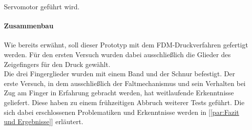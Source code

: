 \documentclass[titlepage,12pt,twoside]{article}
\begin{document}
Servomotor geführt wird. \\
\\
\textbf{Zusammenbau} \\
\\
Wie bereits erwähnt, soll dieser Prototyp mit dem FDM-Druckverfahren gefertigt 
werden. Für den ersten Versuch wurden dabei ausschließlich die Glieder des 
Zeigefingers für den Druck gewählt. \\
Die drei Fingerglieder wurden mit einem Band und der Schnur befestigt. 
Der erste Versuch, in dem ausschließlich der Faltmechanismus und sein 
Verhalten bei Zug am Finger in Erfahrung gebracht werden, hat weitlaufende 
Erkenntnisse geliefert. Diese haben zu einem frühzeitigen Abbruch weiterer 
Tests geführt. Die sich dabei erschlossenen Problematiken und Erkenntnisse 
werden in [\textcolor{blue}{\autoref{par:Fazit und Ergebnisse}}] erläutert. \\
\\
\end{document}
